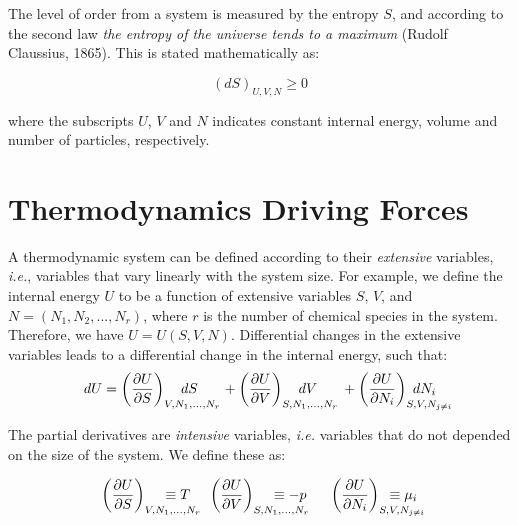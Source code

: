\documentclass[book.tex]{subfiles}
\begin{document}
The level of order from a system is measured by the entropy $S$, and according to the second law \textit{the entropy of the universe tends to a maximum} (Rudolf Claussius, 1865). This is stated mathematically as:

\begin{equation}\label{Second Law}
{\left( dS \right)}_{U,V,N} \ge 0
\end{equation}

\noindent where the subscripts $U$, $V$ and $N$ indicates constant internal energy, volume and number of particles, respectively.

\section{Thermodynamics Driving Forces} 

A thermodynamic system can be defined according to their \textit{extensive} variables, \textit{i.e.}, variables that vary linearly with the system size. For example, we define the internal energy $U$ to be a function of extensive variables $S$, $V$, and $N = (N_1,N_2,...,N_r)$, where $r$ is the number of chemical species in the system. Therefore, we have $U = U(S,V,N)$. 
Differential changes in the extensive variables leads to a differential change in the internal energy, such that:
\begin{equation}\label{Internal Energy Change}
dU ={ \left(\frac{\partial U}{\partial S}\right) }_{V,N_1,...,N_r} \hspace{-1cm} dS 
\hspace{0.6cm} + 
{ \left(\frac{\partial U}{\partial V}\right) }_{S,N_1,...,N_r} \hspace{-1cm} dV
\hspace{0.6cm} + 
{ \left(\frac{\partial U}{\partial N_i}\right) }_{S,V,N_{j\neq i}} \hspace{-1cm} dN_i 
\end{equation}

The partial derivatives are \textit{intensive} variables, \textit{i.e.} variables that do not depended on the size of the system. We define these as:

\begin{equation}\label{intensive variables}
{ \left(\frac{\partial U}{\partial S}\right) }_{V,N_1,...,N_r} \hspace{-1cm} \equiv T \hspace{0.5cm} 
{ \left(\frac{\partial U}{\partial V}\right) }_{S,N_1,...,N_r} \hspace{-1cm} \equiv -p\ 
\hspace{0.5cm} 
{ \left(\frac{\partial U}{\partial N_i}\right) }_{S,V,N_{j\neq i}} \hspace{-1cm} \equiv \mu_i
\end{equation}
\end{document}
